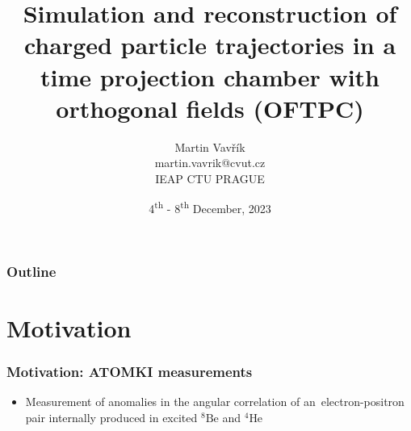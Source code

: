 \documentclass{beamer}
\title[OFTPC track simulation \& reconstruction]{Simulation and reconstruction of charged particle trajectories in a time projection chamber with orthogonal fields (OFTPC)}
\author[M.~Vavřík]{\foreignlanguage{czech}{Martin Vavřík}\vspace{0.5cm}\\martin.vavrik@cvut.cz\\IEAP CTU PRAGUE\\}
\date{4\textsuperscript{th} - 8\textsuperscript{th} December, 2023}
\begin{document}
	
	\begin{frame}
		\titlepage
	\end{frame}
	
	\begin{frame}
		\frametitle{Outline}
		\tableofcontents
	\end{frame}
	
	\section{Motivation}
	\begin{frame}
		\frametitle{Motivation: ATOMKI measurements}
		\begin{itemize}
			\item Measurement of anomalies in the angular correlation of an~electron-positron pair internally produced in excited $ {}^8\text{Be} $ and $ {}^4\text{He} $
		\end{itemize}
	\end{frame}
\end{document}
